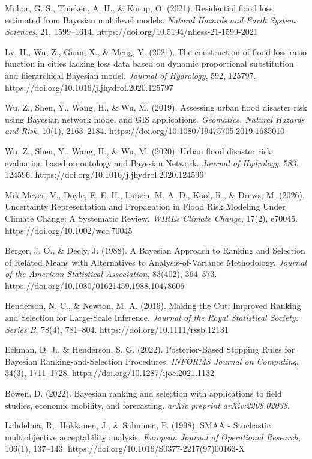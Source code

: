 \documentclass[
]{article}
\begin{document}
Mohor, G. S., Thieken, A. H., \& Korup, O. (2021). Residential flood
loss estimated from Bayesian multilevel models. \emph{Natural Hazards
and Earth System Sciences}, 21, 1599--1614.
https://doi.org/10.5194/nhess-21-1599-2021

Lv, H., Wu, Z., Guan, X., \& Meng, Y. (2021). The construction of flood
loss ratio function in cities lacking loss data based on dynamic
proportional substitution and hierarchical Bayesian model. \emph{Journal
of Hydrology}, 592, 125797.
https://doi.org/10.1016/j.jhydrol.2020.125797

Wu, Z., Shen, Y., Wang, H., \& Wu, M. (2019). Assessing urban flood
disaster risk using Bayesian network model and GIS applications.
\emph{Geomatics, Natural Hazards and Risk}, 10(1), 2163--2184.
https://doi.org/10.1080/19475705.2019.1685010

Wu, Z., Shen, Y., Wang, H., \& Wu, M. (2020). Urban flood disaster risk
evaluation based on ontology and Bayesian Network. \emph{Journal of
Hydrology}, 583, 124596. https://doi.org/10.1016/j.jhydrol.2020.124596

Mik-Meyer, V., Doyle, E. E. H., Larsen, M. A. D., Kool, R., \& Drews, M.
(2026). Uncertainty Representation and Propagation in Flood Risk
Modeling Under Climate Change: A Systematic Review. \emph{WIREs Climate
Change}, 17(2), e70045. https://doi.org/10.1002/wcc.70045

Berger, J. O., \& Deely, J. (1988). A Bayesian Approach to Ranking and
Selection of Related Means with Alternatives to Analysis-of-Variance
Methodology. \emph{Journal of the American Statistical Association},
83(402), 364--373. https://doi.org/10.1080/01621459.1988.10478606

Henderson, N. C., \& Newton, M. A. (2016). Making the Cut: Improved
Ranking and Selection for Large-Scale Inference. \emph{Journal of the
Royal Statistical Society: Series B}, 78(4), 781--804.
https://doi.org/10.1111/rssb.12131

Eckman, D. J., \& Henderson, S. G. (2022). Posterior-Based Stopping
Rules for Bayesian Ranking-and-Selection Procedures. \emph{INFORMS
Journal on Computing}, 34(3), 1711--1728.
https://doi.org/10.1287/ijoc.2021.1132

Bowen, D. (2022). Bayesian ranking and selection with applications to
field studies, economic mobility, and forecasting. \emph{arXiv preprint
arXiv:2208.02038}.

Lahdelma, R., Hokkanen, J., \& Salminen, P. (1998). SMAA - Stochastic
multiobjective acceptability analysis. \emph{European Journal of
Operational Research}, 106(1), 137--143.
https://doi.org/10.1016/S0377-2217(97)00163-X
\end{document}
